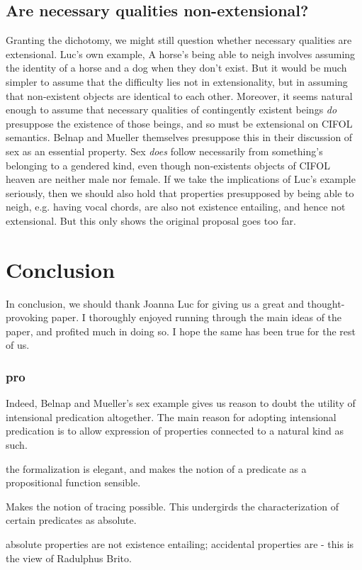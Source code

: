 \documentclass[]{article}
\begin{document}
\subsection{Are necessary qualities non-extensional?}
Granting the dichotomy, we might still question whether necessary qualities are extensional. Luc's own example, A horse's being able to neigh involves assuming the identity of a horse and a dog when they don't exist. But it would be much simpler to assume that the difficulty lies not in extensionality, but in assuming that non-existent objects are identical to each other. Moreover, it seems natural enough to assume that necessary qualities of contingently existent beings \textit{do} presuppose the existence of those beings, and so must be extensional on CIFOL semantics. Belnap and Mueller themselves presuppose this in their discussion of sex as an essential property. Sex \textit{does} follow necessarily from something's belonging to a gendered kind, even though non-existents objects of CIFOL heaven are neither male nor female. If we take the implications of Luc's example seriously, then we should also hold that properties presupposed by being able to neigh, e.g. having vocal chords, are also not existence entailing, and hence not extensional. But this only shows the original proposal goes too far.

\section{Conclusion}
In conclusion, we should thank Joanna Luc for giving us a great and thought-provoking paper. I thoroughly enjoyed running through the main ideas of the paper, and profited much in doing so. I hope the same has been true for the rest of us.
\subsubsection{pro} 
Indeed, Belnap and Mueller's sex example gives us reason to doubt the utility of intensional predication altogether. The main reason for adopting intensional predication is to allow expression of properties connected to a natural kind as such. 

the formalization is elegant, and makes the notion of a predicate as a propositional function sensible. 

Makes the notion of tracing possible. This undergirds the characterization of certain predicates as absolute.

absolute properties are not existence entailing; accidental properties are - this is the view of Radulphus Brito.
\end{document}
